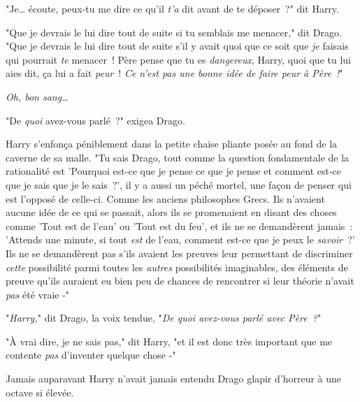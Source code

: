 "Je… écoute, peux-tu me dire ce qu'il \emph{t'a} dit avant de te déposer~?" dit Harry.

"Que je devrais le lui dire tout de suite si tu semblais me menacer," dit Drago. "Que je devrais le lui dire tout de suite s'il y avait quoi que ce soit que \emph{je} faisais qui pourrait \emph{te} menacer~! Père pense que tu es \emph{dangereux}, Harry, quoi que tu lui aies dit, ça lui a fait \emph{peur}~! \emph{Ce n'est pas une bonne idée de faire peur à Père~!}"

\emph{Oh, bon sang…}

"De \emph{quoi} avez-vous parlé~?" exigea Drago.

Harry s'enfonça péniblement dans la petite chaise pliante posée au fond de la caverne de sa malle. "Tu sais Drago, tout comme la question fondamentale de la rationalité est 'Pourquoi est-ce que je pense ce que je pense et comment est-ce que je sais que je le sais~?', il y a aussi un péché mortel, une façon de penser qui est l'opposé de celle-ci. Comme les anciens philosophes Grecs. Ils n'avaient aucune idée de ce qui se passait, alors ils se promenaient en disant des choses comme 'Tout est de l'eau' ou 'Tout est du feu', et ils ne se demandèrent jamais~: 'Attends une minute, si tout \emph{est} de l'eau, comment est-ce que je peux le \emph{savoir}~?' Ils ne se demandèrent pas s'ils avaient les preuves leur permettant de discriminer \emph{cette} possibilité parmi toutes les \emph{autres} possibilités imaginables, des éléments de preuve qu'ils auraient eu bien peu de chances de rencontrer si leur théorie n'avait \emph{pas} été vraie -"

"\emph{Harry,}" dit Drago, la voix tendue, "\emph{De quoi avez-vous parlé avec Père~?}"

"À vrai dire, je ne sais pas," dit Harry, "et il est donc très important que me contente \emph{pas} d'inventer quelque chose -"

Jamais auparavant Harry n'avait jamais entendu Drago glapir d'horreur à une octave si élevée. 

